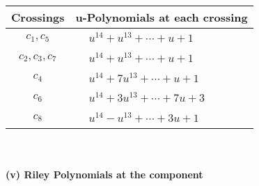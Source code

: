 \documentclass[1p]{elsarticle_modified}
\theoremstyle{definition}
\begin{document}
\begin{tabular}{m{50pt}|m{274pt}}
Crossings & \hspace{64pt}u-Polynomials at each crossing \\
\hline $$\begin{aligned}c_{1},c_{5}\end{aligned}$$&$\begin{aligned}
&u^{14}+u^{13}+\cdots+u+1
\end{aligned}$\\
\hline $$\begin{aligned}c_{2},c_{3},c_{7}\end{aligned}$$&$\begin{aligned}
&u^{14}+u^{13}+\cdots+u+1
\end{aligned}$\\
\hline $$\begin{aligned}c_{4}\end{aligned}$$&$\begin{aligned}
&u^{14}+7 u^{13}+\cdots+u+1
\end{aligned}$\\
\hline $$\begin{aligned}c_{6}\end{aligned}$$&$\begin{aligned}
&u^{14}+3 u^{13}+\cdots+7 u+3
\end{aligned}$\\
\hline $$\begin{aligned}c_{8}\end{aligned}$$&$\begin{aligned}
&u^{14}- u^{13}+\cdots+3 u+1
\end{aligned}$\\
\hline
\end{tabular}\\~\\
\newpage\renewcommand{\arraystretch}{1}
\flushleft \textbf{(v) Riley Polynomials at the component}\newline \\
\end{document}
